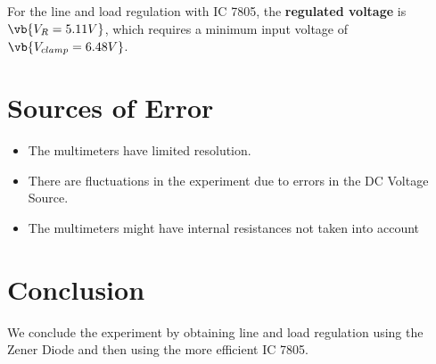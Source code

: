\documentclass{scrartcl}
\newcommand{\1}{\mathbbm{1}}
\begin{document}
For the line and load regulation with IC 7805, the \textbf{regulated voltage} is $\vb{V_R = 5.11V}$, which 
requires a minimum input voltage of $\vb{V_{clamp} = 6.48V}$.
\section{Sources of Error}
\begin{itemize}
	\item The multimeters have limited resolution.
	\item There are fluctuations in the experiment due to errors in the DC Voltage Source.
	\item The multimeters might have internal resistances not taken into account
\end{itemize}
\section{Conclusion}
We conclude the experiment by obtaining line and load regulation using the Zener Diode and then using the more
efficient IC 7805.
\newpage
\end{document}
